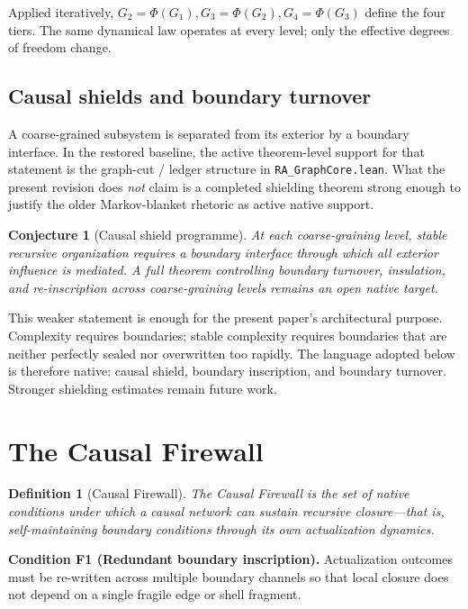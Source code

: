\documentclass[11pt]{article}
\newtheorem{definition}{Definition}
\newtheorem{conjecture}{Conjecture}
\begin{document}
Applied iteratively, $G_2 = \Phi(G_1), G_3 = \Phi(G_2), G_4 = \Phi(G_3)$ define the four tiers. The same dynamical law operates at every level; only the effective degrees of freedom change.

\subsection{Causal shields and boundary turnover}
\label{sec:markov_blanket}

A coarse-grained subsystem is separated from its exterior by a boundary interface. In the restored baseline, the active theorem-level support for that statement is the graph-cut / ledger structure in \texttt{RA\_GraphCore.lean}. What the present revision does \emph{not} claim is a completed shielding theorem strong enough to justify the older Markov-blanket rhetoric as active native support.

\begin{conjecture}[Causal shield programme]
At each coarse-graining level, stable recursive organization requires a boundary interface through which all exterior influence is mediated. A full theorem controlling boundary turnover, insulation, and re-inscription across coarse-graining levels remains an open native target.
\end{conjecture}

This weaker statement is enough for the present paper's architectural purpose. Complexity requires boundaries; stable complexity requires boundaries that are neither perfectly sealed nor overwritten too rapidly. The language adopted below is therefore native: causal shield, boundary inscription, and boundary turnover. Stronger shielding estimates remain future work.

\section{The Causal Firewall}
\label{sec:firewall}

\begin{definition}[Causal Firewall]
The Causal Firewall is the set of native conditions under which a causal network can sustain recursive closure---that is, self-maintaining boundary conditions through its own actualization dynamics.
\end{definition}

\textbf{Condition F1 (Redundant boundary inscription).} Actualization outcomes must be re-written across multiple boundary channels so that local closure does not depend on a single fragile edge or shell fragment.
\end{document}
